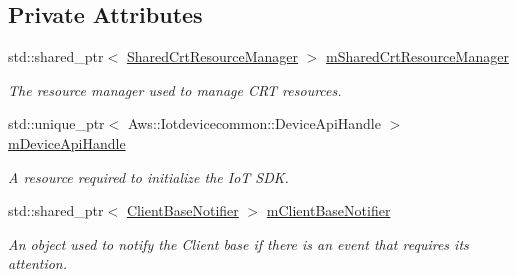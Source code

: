 \subsection*{Private Attributes}
\begin{DoxyCompactItemize}
\item 
\mbox{\label{class_aws_1_1_iot_1_1_device_client_1_1_secure_tunneling_1_1_secure_tunneling_feature_ab7c083e3e44ccc4c68230103b3052d84}} 
std\+::shared\+\_\+ptr$<$ \hyperlink{class_aws_1_1_iot_1_1_device_client_1_1_shared_crt_resource_manager}{Shared\+Crt\+Resource\+Manager} $>$ \hyperlink{class_aws_1_1_iot_1_1_device_client_1_1_secure_tunneling_1_1_secure_tunneling_feature_ab7c083e3e44ccc4c68230103b3052d84}{m\+Shared\+Crt\+Resource\+Manager}
\begin{DoxyCompactList}\small\item\em The resource manager used to manage C\+RT resources. \end{DoxyCompactList}\item 
\mbox{\label{class_aws_1_1_iot_1_1_device_client_1_1_secure_tunneling_1_1_secure_tunneling_feature_a2bad62761f33272e901f3c9046ba4e20}} 
std\+::unique\+\_\+ptr$<$ Aws\+::\+Iotdevicecommon\+::\+Device\+Api\+Handle $>$ \hyperlink{class_aws_1_1_iot_1_1_device_client_1_1_secure_tunneling_1_1_secure_tunneling_feature_a2bad62761f33272e901f3c9046ba4e20}{m\+Device\+Api\+Handle}
\begin{DoxyCompactList}\small\item\em A resource required to initialize the IoT S\+DK. \end{DoxyCompactList}\item 
\mbox{\label{class_aws_1_1_iot_1_1_device_client_1_1_secure_tunneling_1_1_secure_tunneling_feature_a3bec48f8bae11a8b070409a1c6d5a5b4}} 
std\+::shared\+\_\+ptr$<$ \hyperlink{class_aws_1_1_iot_1_1_device_client_1_1_client_base_notifier}{Client\+Base\+Notifier} $>$ \hyperlink{class_aws_1_1_iot_1_1_device_client_1_1_secure_tunneling_1_1_secure_tunneling_feature_a3bec48f8bae11a8b070409a1c6d5a5b4}{m\+Client\+Base\+Notifier}
\begin{DoxyCompactList}\small\item\em An object used to notify the Client base if there is an event that requires its attention. \end{DoxyCompactList}\item 

\end{DoxyCompactItemize}
